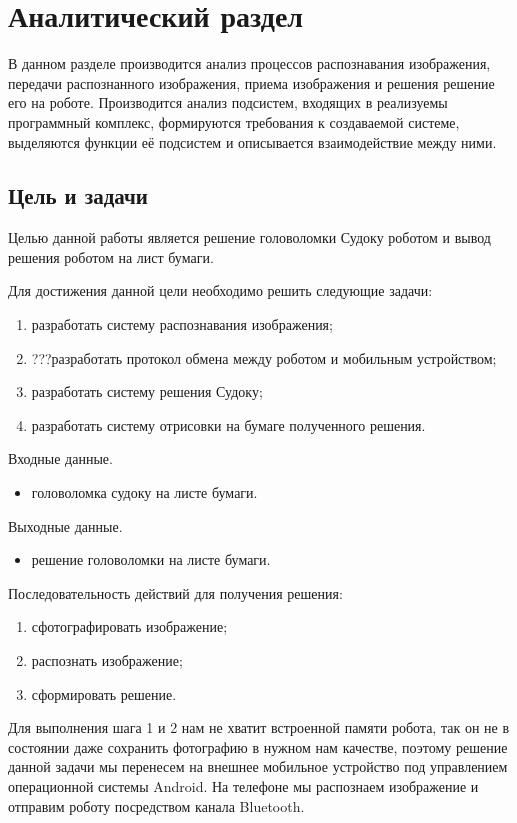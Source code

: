 \chapter{Аналитический раздел}
\label{cha:analysis}
%
%
В данном разделе производится анализ процессов распознавания изображения, передачи распознанного изображения, приема изображения и  решения решение его на роботе.
Производится анализ подсистем, входящих в реализуемы программный комплекс, формируются требования к создаваемой системе, выделяются функции её подсистем и описывается взаимодействие между ними.

\section{Цель и задачи}
Целью данной работы является решение головоломки Судоку роботом и вывод решения роботом на лист бумаги.

Для достижения данной цели необходимо решить следующие задачи:
\begin{enumerate}
\item разработать систему распознавания изображения;
\item ???разработать протокол обмена между роботом и мобильным устройством;
\item разработать систему решения Судоку;
\item разработать систему отрисовки на бумаге полученного решения.
\end{enumerate}

Входные данные.
\begin{itemize}
\item головоломка судоку на листе бумаги.
\end{itemize}

Выходные данные.
\begin{itemize}
\item решение головоломки на листе бумаги.
\end{itemize}

Последовательность действий для  получения решения:
\begin{enumerate}
\item сфотографировать изображение;
\item распознать изображение;
\item сформировать решение.
\end{enumerate}
Для выполнения шага 1 и 2 нам не хватит встроенной памяти робота, так он не в состоянии даже сохранить фотографию в нужном нам качестве, поэтому решение данной задачи мы перенесем на внешнее мобильное устройство под управлением операционной системы Android. На телефоне мы распознаем изображение и отправим роботу посредством канала Bluetooth.

